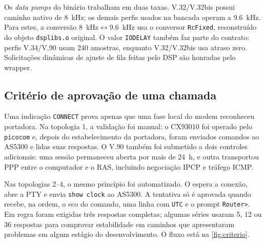 \documentclass[12pt,a4paper]{article}
\newcommand{\arquivo}[1]{{\def\UrlLeft{}\def\UrlRight{}\path{#1}}}
\begin{document}
Os \emph{data pumps} do binário trabalham em duas taxas. V.32/V.32bis possui
caminho nativo de \SI{8}{kHz}; os demais perfis usados na bancada operam a
\SI{9.6}{kHz}. Para estes, a conversão \SI{8}{kHz}$\leftrightarrow$\SI{9.6}{kHz}
usa o conversor \texttt{RcFixed}, reconstruído do objeto \texttt{dsplibs.o} original.
O valor \texttt{IODELAY} também faz parte do contrato: perfis
V.34/V.90 usam 240 amostras, enquanto V.32/V.32bis usa atraso zero.
Solicitações dinâmicas de ajuste de fila feitas pelo DSP são
honradas pelo wrapper.

\subsection{Critério de aprovação de uma chamada}

Uma indicação \texttt{CONNECT} prova apenas que uma fase local do modem reconheceu
portadora. Na topologia 1, a validação foi manual: o CX93010 foi operado pelo
\texttt{picocom} e, depois do estabelecimento da portadora, foram enviados comandos
ao AS5300 e lidas suas respostas. O V.90 também foi submetido a dois controles
adicionais: uma sessão permaneceu aberta por mais de \SI{24}{h}, e outra transportou
PPP entre o computador e o RAS, incluindo negociação IPCP e tráfego ICMP.

Nas topologias 2--4, o mesmo princípio foi automatizado. O \arquivo{dialbench}
espera a conexão, abre a PTY e envia \texttt{show clock} ao AS5300. A tentativa só
é aprovada quando recebe, na ordem, o eco do comando, uma linha com \texttt{UTC} e
o prompt \texttt{Router>}. Em regra foram exigidas três respostas completas;
algumas séries usaram 5, 12 ou 36 respostas para comprovar estabilidade em caminhos
que apresentaram problemas em algum estágio do desenvolvimento. O fluxo está na
\cref{fig:criterio}.
\end{document}
